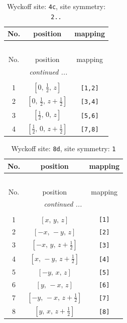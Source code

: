 \documentclass[fleqn,8pt]{jsarticle}
\begin{document}
\renewcommand{\arraystretch}{1.2}
\begin{longtable}{ccc}
\caption{Wyckoff site: {\tt 4c}, site symmetry: {\tt 2..}}
 \\
 \hline \hline
No. & position & mapping \\ \hline \endfirsthead

\multicolumn{2}{l}{\tablename\ \thetable{}} \\
 \hline \hline
No. & position & mapping \\ \hline \endhead

 \hline \hline
\multicolumn{2}{r}{\footnotesize\it continued ...} \\ \endfoot

 \hline \hline
\multicolumn{2}{r}{} \\ \endlastfoot

1 & $\left[ 0,\, \frac{1}{2},\, z \right]$ & {\tt [1,2]} \\ \hline
2 & $\left[ 0,\, \frac{1}{2},\, z + \frac{1}{2} \right]$ & {\tt [3,4]} \\ \hline
3 & $\left[ \frac{1}{2},\, 0,\, z \right]$ & {\tt [5,6]} \\ \hline
4 & $\left[ \frac{1}{2},\, 0,\, z + \frac{1}{2} \right]$ & {\tt [7,8]} \\
\end{longtable}
\renewcommand{\arraystretch}{1.2}
\begin{longtable}{ccc}
\caption{Wyckoff site: {\tt 8d}, site symmetry: {\tt 1}}
 \\
 \hline \hline
No. & position & mapping \\ \hline \endfirsthead

\multicolumn{2}{l}{\tablename\ \thetable{}} \\
 \hline \hline
No. & position & mapping \\ \hline \endhead

 \hline \hline
\multicolumn{2}{r}{\footnotesize\it continued ...} \\ \endfoot

 \hline \hline
\multicolumn{2}{r}{} \\ \endlastfoot

1 & $\left[ x,\, y,\, z \right]$ & {\tt [1]} \\ \hline
2 & $\left[ - x,\, - y,\, z \right]$ & {\tt [2]} \\ \hline
3 & $\left[ - x,\, y,\, z + \frac{1}{2} \right]$ & {\tt [3]} \\ \hline
4 & $\left[ x,\, - y,\, z + \frac{1}{2} \right]$ & {\tt [4]} \\ \hline
5 & $\left[ - y,\, x,\, z \right]$ & {\tt [5]} \\ \hline
6 & $\left[ y,\, - x,\, z \right]$ & {\tt [6]} \\ \hline
7 & $\left[ - y,\, - x,\, z + \frac{1}{2} \right]$ & {\tt [7]} \\ \hline
8 & $\left[ y,\, x,\, z + \frac{1}{2} \right]$ & {\tt [8]} \\
\end{longtable}
\end{document}
